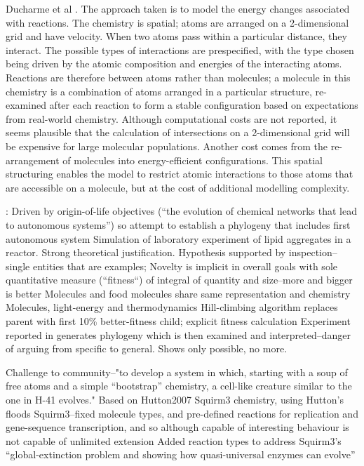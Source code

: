 Ducharme et al \parencite{Ducharme2012}. The approach taken is to model the energy changes associated with reactions. The chemistry is spatial; atoms are arranged on a 2-dimensional grid and have velocity. When two atoms pass within a particular distance, they interact. The possible types of interactions are prespecified, with the type chosen being driven by the atomic composition and energies of the interacting atoms. Reactions are therefore between atoms rather than molecules; a molecule in this chemistry is a combination of atoms arranged in a particular structure, re-examined after each reaction to form a stable configuration based on expectations from real-world chemistry. Although computational costs are not reported, it seems plausible that the calculation of intersections on a 2-dimensional grid will be expensive for large molecular populations. Another cost comes from the re-arrangement of molecules into energy-efficient configurations. This spatial structuring enables the model to restrict atomic interactions to those atoms that are accessible on a molecule, but at the cost of additional modelling complexity. 

\cite{Fernando:2008xy,Fernando:2007pf}:
Driven by origin-of-life objectives (``the evolution of chemical networks that lead to autonomous systems'') so attempt to establish a phylogeny that includes first autonomous system
Simulation of laboratory experiment of lipid aggregates in a reactor. Strong theoretical justification. Hypothesis supported by inspection--single entities that are examples; Novelty is implicit in overall goals with sole quantitative measure (``fitness``) of integral of quantity and size--more and bigger is better
Molecules and food molecules share same representation and chemistry
Molecules, light-energy and thermodynamics
Hill-climbing algorithm replaces parent with first 10\% better-fitness child; explicit fitness calculation
Experiment reported in \textcite{Fernando:2008xy} generates phylogeny which is then examined and interpreted--danger of arguing from specific to general. Shows only possible, no more.

\parencite{Lucht2012}

Challenge to community--"to develop a system in which, starting with a soup of free atoms and a simple ``bootstrap'' chemistry, a cell-like creature similar to the one in H-41 evolves."
Based on Hutton2007 Squirm3 chemistry, using Hutton's floods 
Squirm3--fixed molecule types, and pre-defined reactions for replication and gene-sequence transcription, and so although capable of interesting behaviour is not capable of unlimited extension
Added reaction types to address Squirm3's ``global-extinction problem and showing how quasi-universal enzymes can evolve''

